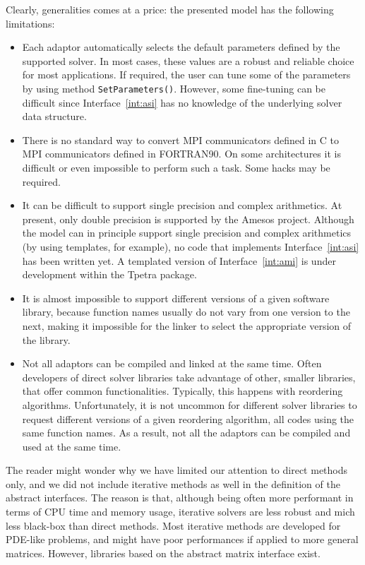 \documentclass[acmtocl]{acmtrans2m}
\begin{document}
Clearly,  generalities comes at a price: the presented model has the following
limitations:
\begin{itemize}
\item 
Each adaptor automatically selects the default parameters defined by the
supported solver. In most cases, these values are a robust and reliable choice
for most applications. If required, the user can tune some of the parameters
by using method \verb!SetParameters()!. However, some fine-tuning can be
difficult since Interface~\ref{int:asi} has no knowledge of the underlying
solver data structure.

\item There
  is no standard way to 
  convert MPI communicators defined in C to MPI communicators defined
  in FORTRAN90. On some architectures it is difficult or even
  impossible to perform such a task. Some hacks may be required.

\item It can be difficult to support single precision and complex arithmetics.
At present, only double precision is supported by the Amesos project. 
Although the model can in
principle support single precision and complex arithmetics 
(by using templates, for example), no code
that implements Interface~\ref{int:asi} has been written yet. A templated
version of Interface~\ref{int:ami} is under development within the Tpetra
package.

\item 
It is almost impossible to support different versions of a given software
library, because
function names usually do not vary from one version to the
next, making it impossible for the linker to select the
  appropriate version of the library.

\item 
Not all adaptors can be compiled and linked at the same time. Often
developers of direct solver libraries take advantage of other, smaller
libraries, that offer common functionalities. Typically, this happens with
reordering algorithms. Unfortunately,
  it is not uncommon for different solver libraries to request different
  versions of a given reordering algorithm, all codes using the same function
  names. As a result, not all the adaptors can be compiled and used at the
  same time.
\end{itemize}

The reader might wonder why we have limited our attention to direct methods only, and
we did not include iterative methods as well in the definition of the abstract
interfaces. The reason is that, although
being often more performant in terms of CPU time and memory usage, iterative
solvers are less robust and mich less black-box than direct methods. Most
iterative methods are developed for PDE-like problems, and might have poor
performances if applied to more general matrices. However, libraries based on
the abstract matrix interface exist.
\end{document}
